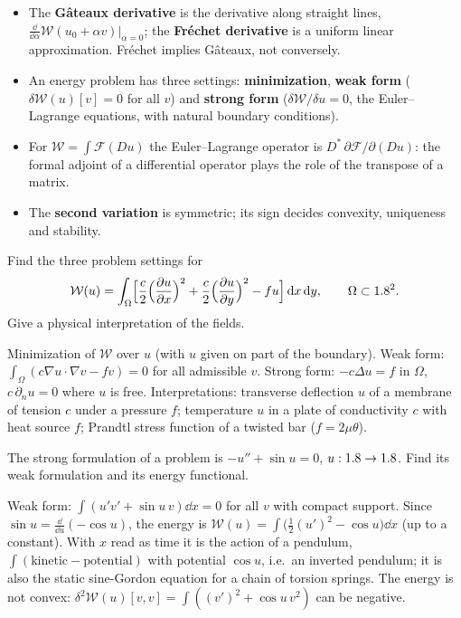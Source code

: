 \begin{gbox*}
\begin{itemize}
  \item The \textbf{G\^ateaux derivative} is the derivative along straight
  lines, $\displaystyle \frac{\dd}{\dd\alpha}\mathcal W(u_0+\alpha v)|_{\alpha=0}$; the
  \textbf{Fr\'echet derivative} is a uniform linear approximation. Fr\'echet
  implies G\^ateaux, not conversely.
  \item An energy problem has three settings: \textbf{minimization},
  \textbf{weak form} ($\delta\mathcal W(u)[v]=0$ for all $v$) and
  \textbf{strong form} ($\delta\mathcal W/\delta u=0$, the Euler--Lagrange
  equations, with natural boundary conditions).
  \item For $\displaystyle \mathcal W=\int\mathcal F(Du)$ the Euler--Lagrange operator is
  $D^\ast\,\partial\mathcal F/\partial(Du)$: the formal adjoint of a
  differential operator plays the role of the transpose of a matrix.
  \item The \textbf{second variation} is symmetric; its sign decides
  convexity, uniqueness and stability.
\end{itemize}
\end{gbox*}


\label{exo:A-membrane}
Find the three problem settings for
\[
  \mathcal W(u)=\int_\Omega\Bigl[\frac c2\Bigl(\frac{\partial u}{\partial x}\Bigr)^2
  +\frac c2\Bigl(\frac{\partial u}{\partial y}\Bigr)^2-fu\Bigr]\,\mathrm{d} x\,\mathrm{d} y,
  \qquad\Omega\subset1.8^2 .
\]
Give a physical interpretation of the fields.
\begin{solution}
Minimization of $\mathcal W$ over $u$ (with $u$ given on part of the boundary).
Weak form: $\displaystyle \int_\Omega(c\nabla u\cdot\nabla v-fv)=0$ for all admissible $v$.
Strong form: $-c\Delta u=f$ in $\Omega$, $c\,\partial_nu=0$ where $u$ is free.
Interpretations: transverse deflection $u$ of a membrane of tension $c$ under
a pressure $f$; temperature $u$ in a plate of conductivity $c$ with heat
source $f$; Prandtl stress function of a twisted bar ($f=2\mu\theta$).
\end{solution}

\label{exo:A-pendulum}
The strong formulation of a problem is $-u''+\sin u=0$,
$u:1.8\to1.8$. Find its weak formulation and its energy functional.
\begin{solution}
Weak form: $\displaystyle \int(u'v'+\sin u\,v)\dd x=0$ for all $v$ with compact support.
Since $\displaystyle \sin u=\frac{\dd}{\dd u}(-\cos u)$, the energy is
$\displaystyle \mathcal W(u)=\int\bigl(\tfrac12(u')^2-\cos u\bigr)\dd x$ (up to a constant).
With $x$ read as time it is the action of a pendulum,
$\displaystyle \int(\text{kinetic}-\text{potential})$ with potential $\cos u$, i.e.\ an inverted
pendulum; it is also the static sine-Gordon equation for a chain of torsion
springs. The energy is not convex: $\displaystyle \delta^2\mathcal W(u)[v,v]=\int((v')^2+\cos u\,v^2)$
can be negative.
\end{solution}

